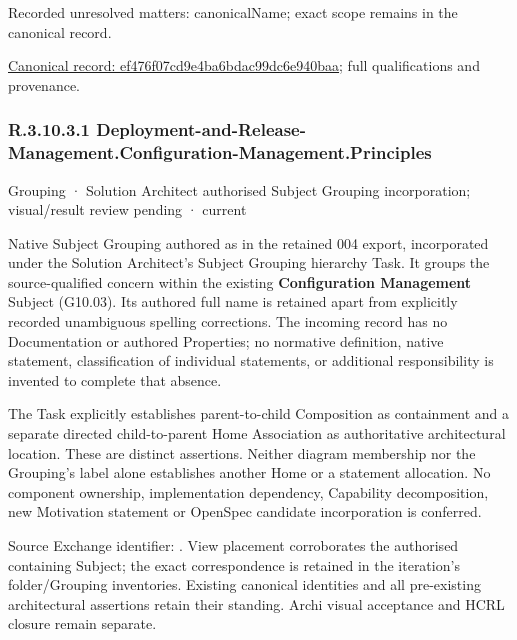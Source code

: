 {\small Recorded unresolved matters: canonicalName; exact scope remains in the canonical record.}\par
{\footnotesize \href{../../../../continuum/grouping/ef476f07cd9e4ba6bdac99dc6e940baa.md}{Canonical record: ef476f07cd9e4ba6bdac99dc6e940baa}; full qualifications and provenance.}\par
\subsubsection*{R.3.10.3.1 Deployment-and-Release-Management.Configuration-Management.Principles}
\label{navigation:R.3.10.3.1}

\label{element:f6985401675b47c0a1c480aa156aaa0c}
{\small Grouping · Solution Architect authorised Subject Grouping incorporation; visual/result review pending · current}\par

Native Subject Grouping authored as \texttt{} in the retained 004 export,
incorporated under the Solution Architect's Subject Grouping hierarchy Task.
It groups the source-qualified \texttt{} concern within
the existing \textbf{Configuration Management} Subject (G10.03). Its authored full name
is retained apart from explicitly recorded unambiguous spelling corrections.
The incoming record has no Documentation or authored Properties; no normative
definition, native statement, classification of individual statements, or
additional responsibility is invented to complete that absence.



The Task explicitly establishes parent-to-child Composition as containment and
a separate directed child-to-parent Home Association as authoritative architectural
location. These are distinct assertions. Neither diagram membership nor the
Grouping's label alone establishes another Home or a statement allocation.
No component ownership, implementation dependency, Capability decomposition,
new Motivation statement or OpenSpec candidate incorporation is conferred.



Source Exchange identifier: \texttt{}. View placement corroborates
the authorised containing Subject; the exact correspondence is retained in the
iteration's folder/Grouping inventories. Existing canonical identities and all
pre-existing architectural assertions retain their standing. Archi visual
acceptance and HCRL closure remain separate.


